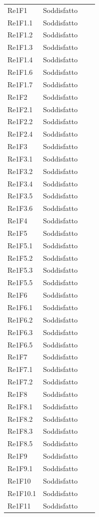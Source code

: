 \begin{longtable}{C{3cm} C{3cm} L{5.5cm} C{3cm}}
Re1F1 	& Soddisfatto\\
Re1F1.1 & Soddisfatto\\
Re1F1.2 & Soddisfatto\\
Re1F1.3 & Soddisfatto\\
Re1F1.4 & Soddisfatto\\
Re1F1.6 & Soddisfatto\\
Re1F1.7 & Soddisfatto\\
Re1F2 	& Soddisfatto\\
Re1F2.1 & Soddisfatto\\
Re1F2.2 & Soddisfatto\\
Re1F2.4 & Soddisfatto\\
Re1F3 	& Soddisfatto\\
Re1F3.1 & Soddisfatto\\
Re1F3.2 & Soddisfatto\\
Re1F3.4 & Soddisfatto\\
Re1F3.5 & Soddisfatto\\
Re1F3.6 & Soddisfatto\\
Re1F4 	& Soddisfatto\\
Re1F5 	& Soddisfatto\\
Re1F5.1 & Soddisfatto\\
Re1F5.2 & Soddisfatto\\
Re1F5.3 & Soddisfatto\\
Re1F5.5 & Soddisfatto\\
Re1F6 	& Soddisfatto\\
Re1F6.1 & Soddisfatto\\
Re1F6.2 & Soddisfatto\\
Re1F6.3 & Soddisfatto\\
Re1F6.5 & Soddisfatto\\
Re1F7 	& Soddisfatto\\
Re1F7.1 & Soddisfatto\\
Re1F7.2 & Soddisfatto\\
Re1F8 	& Soddisfatto\\
Re1F8.1 & Soddisfatto\\
Re1F8.2 & Soddisfatto\\
Re1F8.3 & Soddisfatto\\
Re1F8.5 & Soddisfatto\\
Re1F9 	& Soddisfatto\\
Re1F9.1 & Soddisfatto\\
Re1F10 	& Soddisfatto\\
Re1F10.1& Soddisfatto\\
Re1F11 	& Soddisfatto\\

\end{longtable}

